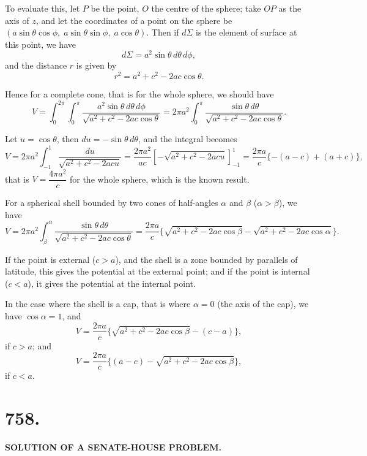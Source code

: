 \documentclass[11pt,a4paper]{book}
\begin{document}
To evaluate this, let $P$ be the point, $O$ the centre of the sphere; take
$OP$ as the axis of $z$, and let the coordinates of a point on the sphere be
$(a\sin\theta\cos\phi,\; a\sin\theta\sin\phi,\; a\cos\theta)$.
Then if $d\Sigma$ is the element of surface at this point, we have
%
\[
d\Sigma = a^2 \sin\theta \, d\theta \, d\phi,
\]
%
and the distance $r$ is given by
%
\[
r^2 = a^2 + c^2 - 2ac\cos\theta.
\]

Hence for a complete cone, that is for the whole sphere, we should have
%
\[
V = \int_0^{2\pi} \!\! \int_0^{\pi}
\frac{a^2 \sin\theta \, d\theta \, d\phi}{\sqrt{a^2 + c^2 - 2ac\cos\theta}}
= 2\pi a^2 \int_0^{\pi} \frac{\sin\theta \, d\theta}{\sqrt{a^2 + c^2 - 2ac\cos\theta}}.
\]

Let $u = \cos\theta$, then $du = -\sin\theta \, d\theta$, and the integral becomes
%
\[
V = 2\pi a^2 \int_{-1}^{1} \frac{du}{\sqrt{a^2 + c^2 - 2acu}}
= \frac{2\pi a^2}{ac} \left[ -\sqrt{a^2 + c^2 - 2acu} \right]_{-1}^{1}
= \frac{2\pi a}{c} \{ -(a-c) + (a+c) \},
\]
%
that is $V = \dfrac{4\pi a^2}{c}$ for the whole sphere, which is the known result.

For a spherical shell bounded by two cones of half-angles $\alpha$ and $\beta$
($\alpha > \beta$), we have
%
\[
V = 2\pi a^2 \int_{\beta}^{\alpha}
\frac{\sin\theta \, d\theta}{\sqrt{a^2 + c^2 - 2ac\cos\theta}}
= \frac{2\pi a}{c} \{ \sqrt{a^2 + c^2 - 2ac\cos\beta}
- \sqrt{a^2 + c^2 - 2ac\cos\alpha} \}.
\]

If the point is external ($c > a$), and the shell is a zone bounded by
parallels of latitude, this gives the potential at the external point; and if
the point is internal ($c < a$), it gives the potential at the internal point.

In the case where the shell is a cap, that is where $\alpha = 0$ (the axis of
the cap), we have $\cos\alpha = 1$, and
%
\[
V = \frac{2\pi a}{c} \{ \sqrt{a^2 + c^2 - 2ac\cos\beta} - (c-a) \},
\]
if $c > a$; and
%
\[
V = \frac{2\pi a}{c} \{ (a-c) - \sqrt{a^2 + c^2 - 2ac\cos\beta} \},
\]
if $c < a$.

\newpage


\section*{758.}

\begin{center}
\textbf{SOLUTION OF A SENATE-HOUSE PROBLEM.}
\end{center}
\end{document}

